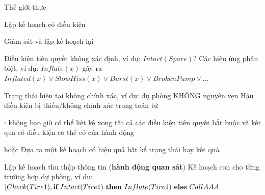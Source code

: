 \documentclass{article}
\newcommand{\condstep}[3]{\mbf{if}~#1~\mbf{then}~#2~\mbf{else}~#3}
\begin{document}
\begin{huge}

\sf


\blob Thế giới thực

\blob Lập kế hoạch có điều kiện

\blob Giám sát và lập kế hoạch lại



\vspace*{0.2in}

\textwidth
{}

\vspace*{0.4in}

\textwidth
{}




\al
  Điều kiện tiên quyết không xác định, ví dụ: $Intact(Spare)$?\al
  Các hiệu ứng phân biệt, ví dụ: $Inflate(x)$ gây ra\nl
    $Inflated(x) \lor SlowHiss(x) \lor Burst(x) \lor BrokenPump \lor \ldots$

\al
  Trạng thái hiện tại không chính xác, ví dụ: dự phòng KHÔNG nguyên vẹn\al
  Hậu điều kiện bị thiếu/không chính xác trong toán tử

:\nl
   không bao giờ có thể liệt kê xong tất cả các điều kiện tiên quyết bắt buộc và\nl
   kết quả có điều kiện có thể có của hành động



 hoặc \nl
   Đưa ra một kế hoạch có hiệu quả bất kể trạng thái hay kết quả\\

\nl
    Lập kế hoạch thu thập thông tin ({\bf hành động quan sát})\nl
    Kế hoạch con cho từng trường hợp dự phòng, ví dụ:\nl
    $[Check(Tire1),\condstep{Intact(Tire1)}{Inflate(Tire1)}{CallAAA}$\\


\end{huge}
\end{document}
